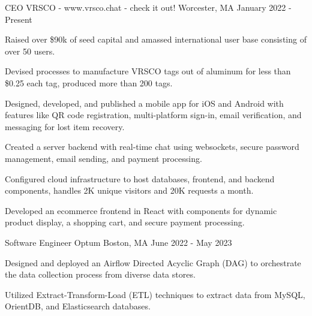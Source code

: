 

\begin{cventries}

  \cventry
    {CEO} %
    {VRSCO - www.vrsco.chat - check it out!} %
    {Worcester, MA} %
    {January 2022 - Present}
    {
      \begin{cvitems} %
      \item {Raised over \$90k of seed capital and amassed international user base consisting of over 50 users.}
      \item {Devised processes to manufacture VRSCO tags out of aluminum for less than \$0.25 each tag, produced more than 200 tags.}
      \item {Designed, developed, and published a mobile app for iOS and Android with features like QR code registration, multi-platform sign-in, email verification, and messaging for lost item recovery.}
      \item {Created a server backend with real-time chat using websockets, secure password management, email sending, and payment processing.}
      \item {Configured cloud infrastructure to host databases, frontend, and backend components, handles 2K unique visitors and 20K requests a month.}
      \item {Developed an ecommerce frontend in React with components for dynamic product display, a shopping cart, and secure payment processing.}
      \end{cvitems}
    }
  \cventry
    {Software Engineer} %
    {Optum} %
    {Boston, MA} %
    {June 2022 - May 2023} %
    {
      \begin{cvitems} %
        \item {Designed and deployed an Airflow Directed Acyclic Graph (DAG) to orchestrate the data collection process from diverse data stores.}
        \item {Utilized Extract-Transform-Load (ETL) techniques to extract data from MySQL, OrientDB, and Elasticsearch databases.}

\end{cvitems}}
\end{cventries}
